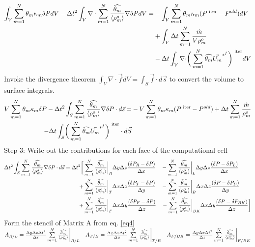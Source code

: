 \documentclass[fleqn]{article}
\newcommand{\SUM}[1]    {\ensuremath{\sum \limits_{{#1}=1}^N }}
\newcommand{\B}[1]      {\biggr{#1}}
\newcommand{\rhoM}      {\ensuremath{\rho^{o}_m}}
\newcommand{\rhoMFC}    {\ensuremath{\langle \rhoM \rangle}}
\newcommand{\delt}      {\ensuremath{\Delta{t}} }
\newcommand{\delx}      {\ensuremath{\Delta{x}} }
\newcommand{\dely}      {\ensuremath{\Delta{y}} }
\newcommand{\delz}      {\ensuremath{\Delta{z}} }
\newcommand{\velFC}     {\ensuremath{\vec{U_m}^{*^{f}} } }
\newcommand{\thetaUW}   {\ensuremath{\widehat{\theta_m}} }
\newcommand{\iter}      {\ensuremath{\text{ iter}}}
\newcommand{\massSrc}   {\ensuremath{ \SUM{m}  \frac{\dot{m}} {V \rhoM} } }
\begin{document}
\begin{align}
  \int_{V} \SUM{m} \theta_m \kappa_m \delta{P} dV 
  - \delt^2 \int_{V} \nabla \cdot \SUM{m} \frac{\thetaUW}{\rhoMFC} \nabla \delta{P} dV
  = 
  &- \int_{V} \SUM{m} \theta_m \kappa_m(P^{\iter} - P^{old} ) dV \notag\\
  &+ \int_{V} \delt \massSrc \notag \\
  &- \delt \int_{V} \nabla \cdot \B{(} \SUM{m} \thetaUW \velFC \B{)} ^{\iter} dV \notag
\end{align}
%
%
Invoke the divergence theorem  
    $\int_V \nabla \cdot \vec{f} dV = \int_S \vec{f} \cdot d\vec{s}$
to convert the volume to surface integrals.
%
\begin{align}
  V \SUM{m} \theta_m \kappa_m \delta{P} 
  - \delt^2 \int_{S}  \SUM{m} \frac{\thetaUW}{\rhoMFC} \nabla \delta{P} \cdot d\vec{s}
  =
  &-V \SUM{m} \theta_m \kappa_m(P^{\iter} - P^{old} )
  + \delt  \SUM{m}  \frac{\dot{m}} {\rhoM} \notag \\
  - \delt \int_{S}  \B{(} \SUM{m} \thetaUW \velFC \B{)} ^{\iter} \cdot d\vec{S} \notag
\end{align}
%
%
Step 3: \hspace{0.25in} Write out the contributions for each face of the computational cell
\begin{align}
\label{eq4}
\delt^2 \int_{S}  \SUM{m} \frac{\thetaUW}{\rhoMFC} \nabla \delta{P} \cdot d\vec{s}
 = \delt^2 \B{[}
  &\SUM{m} \frac{\thetaUW}{\rhoMFC} \B{|}_R \dely \delz \frac {( \delta{P_R}  - \delta{P} )}{\delx} \quad
-  \SUM{m} \frac{\thetaUW}{\rhoMFC} \B{|}_L \dely \delz \frac {( \delta{P}    - \delta{P_L} )}{\delx}   \notag \\
+ &\SUM{m} \frac{\thetaUW}{\rhoMFC} \B{|}_T \delx \delz \frac {( \delta{P_T}  - \delta{P} )}{\dely} \quad
-  \SUM{m} \frac{\thetaUW}{\rhoMFC} \B{|}_B \delx \delz \frac {( \delta{P}    - \delta{P_B} )}{\dely} \notag\\
+ &\SUM{m} \frac{\thetaUW}{\rhoMFC} \B{|}_F \delx \dely \frac {( \delta{P_F}  - \delta{P} )}{\delz} \quad
-  \SUM{m} \frac{\thetaUW}{\rhoMFC} \B{|}_{BK} \delx \dely \frac {( \delta{P} - \delta{P_{BK}} )}{\delz}
\B{]}
\end{align}
%
%
Form the stencil of Matrix A from eq. {\ref{eq4}}\\
  $A_{R/L}  = \frac{\dely \delz \delt^2}{\delx} \SUM{m} \frac{\thetaUW}{\rhoMFC} \B{|}_{R/L}  \quad  
   A_{T/B}  = \frac{\delx \delz \delt^2}{\dely} \SUM{m} \frac{\thetaUW}{\rhoMFC} \B{|}_{T/B}  \quad  
   A_{F/BK} = \frac{\dely \delx \delt^2}{\delz} \SUM{m} \frac{\thetaUW}{\rhoMFC} \B{|}_{F/BK}$ \\    
\end{document}
